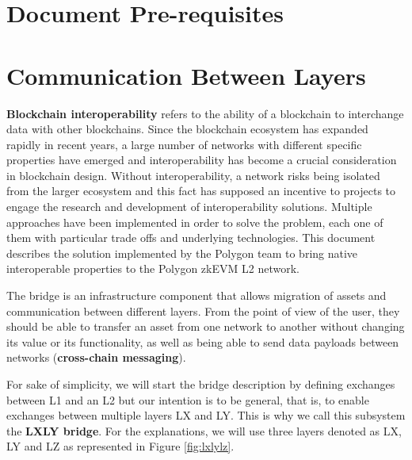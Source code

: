 




\section{Document Pre-requisites}





\section{Communication Between Layers}

\textbf{Blockchain interoperability} refers to the ability of a blockchain to interchange data with other blockchains. Since the blockchain ecosystem has expanded rapidly in recent years, a large number of networks with different specific properties have emerged and interoperability has become a crucial consideration in blockchain design. Without interoperability, a network risks being isolated from the larger ecosystem and this fact has supposed an incentive to projects to engage the research and development of interoperability solutions. Multiple approaches have been implemented in order to solve the problem, each one of them with particular trade offs and underlying technologies. This document describes the solution implemented by the Polygon team to bring native interoperable properties to the Polygon zkEVM L2 network.

The bridge is an infrastructure component that allows migration of assets and communication between different layers. From the point of view of the user, they should be able to transfer an asset from one network to another without changing its value or its functionality, as well as being able to send data payloads between networks (\textbf{cross-chain messaging}).

For sake of simplicity, we will start the bridge description by defining exchanges between L1 and an L2 but our intention is to be general, that is, to enable exchanges between multiple layers LX and LY. This is why we call this subsystem the \textbf{LXLY bridge}. For the explanations, we will use three layers denoted as LX, LY and LZ as represented in Figure \ref{fig:lxlylz}.

